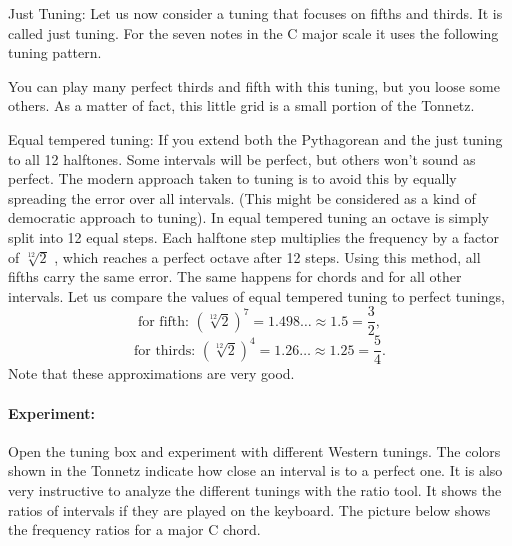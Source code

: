 Just Tuning: Let us now consider a tuning that focuses on fifths and thirds. It is called just tuning. For the seven notes in the C major scale it uses the following tuning pattern.

You can play many perfect thirds and fifth with this tuning, but you loose some others. As a matter of fact, this little grid is a small portion of the Tonnetz.


Equal tempered tuning: If you extend both the Pythagorean and the just tuning to all 12 halftones. Some intervals will be perfect, but others won't sound as perfect. The modern approach taken to tuning is to avoid this by equally spreading the error over all intervals. (This might be considered as a kind of democratic approach to tuning). In equal tempered tuning an octave is simply split into 12 equal steps. Each halftone step multiplies the frequency by a factor of $\sqrt[12]{2}$ , which reaches a perfect octave after 12 steps. Using this method, all fifths carry the same error. The same happens for chords and for all other intervals. Let us compare the values of equal tempered tuning to perfect tunings,
$$\textrm{for fifth: } (\sqrt[12]{2})^7 = 1.498\ldots \approx 1.5 = \frac{3}{2} ,$$
$$\textrm{for thirds: } (\sqrt[12]{2})^4 = 1.26\ldots \approx 1.25 = \frac{5}{4} .$$
Note that these approximations are very good.

\paragraph{Experiment:}
Open the tuning box and experiment with different Western tunings. The colors shown in the Tonnetz indicate how close an interval is to a perfect one. It is also very instructive to analyze the different tunings with the ratio tool. It shows the ratios of intervals if they are played on the keyboard. The picture below shows the frequency ratios for a major C chord.


\begin{figure}[h]
\centering
{}
\end{figure}

